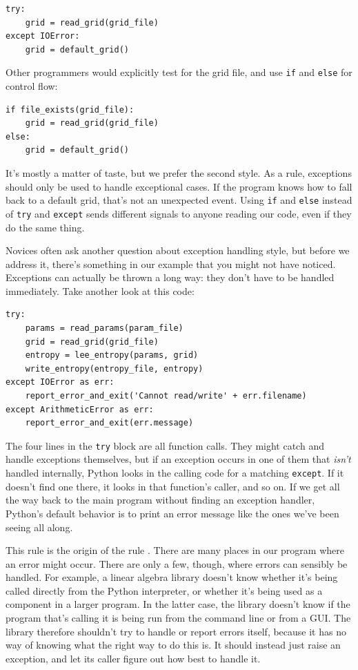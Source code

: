 \documentclass{book}
\begin{document}
\begin{verbatim}
try:
    grid = read_grid(grid_file)
except IOError:
    grid = default_grid()
\end{verbatim}

Other programmers would explicitly test for the grid file, and use
\texttt{if} and \texttt{else} for control flow:

\begin{verbatim}
if file_exists(grid_file):
    grid = read_grid(grid_file)
else:
    grid = default_grid()
\end{verbatim}

It's mostly a matter of taste, but we prefer the second style. As a
rule, exceptions should only be used to handle exceptional cases. If the
program knows how to fall back to a default grid, that's not an
unexpected event. Using \texttt{if} and \texttt{else} instead of
\texttt{try} and \texttt{except} sends different signals to anyone
reading our code, even if they do the same thing.

Novices often ask another question about exception handling style, but
before we address it, there's something in our example that you might
not have noticed. Exceptions can actually be thrown a long way: they
don't have to be handled immediately. Take another look at this code:

\begin{verbatim}
try:
    params = read_params(param_file)
    grid = read_grid(grid_file)
    entropy = lee_entropy(params, grid)
    write_entropy(entropy_file, entropy)
except IOError as err:
    report_error_and_exit('Cannot read/write' + err.filename)
except ArithmeticError as err:
    report_error_and_exit(err.message)
\end{verbatim}

The four lines in the \texttt{try} block are all function calls. They
might catch and handle exceptions themselves, but if an exception occurs
in one of them that \emph{isn't} handled internally, Python looks in the
calling code for a matching \texttt{except}. If it doesn't find one
there, it looks in that function's caller, and so on. If we get all the
way back to the main program without finding an exception handler,
Python's default behavior is to print an error message like the ones
we've been seeing all along.

This rule is the origin of the rule
. There
are many places in our program where an error might occur. There are
only a few, though, where errors can sensibly be handled. For example, a
linear algebra library doesn't know whether it's being called directly
from the Python interpreter, or whether it's being used as a component
in a larger program. In the latter case, the library doesn't know if the
program that's calling it is being run from the command line or from a
GUI. The library therefore shouldn't try to handle or report errors
itself, because it has no way of knowing what the right way to do this
is. It should instead just raise an exception, and let its caller figure
out how best to handle it.
\end{document}
